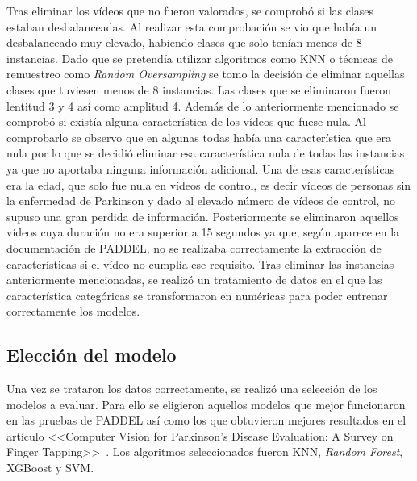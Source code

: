 Tras eliminar los vídeos que no fueron valorados, se comprobó si las clases estaban desbalanceadas. Al realizar esta comprobación se vio que había un desbalanceado muy elevado, habiendo clases que solo tenían menos de 8 instancias. Dado que se pretendía utilizar algoritmos como KNN o técnicas de remuestreo como \textit{Random Oversampling} se tomo la decisión de eliminar aquellas clases que tuviesen menos de 8 instancias. Las clases que se eliminaron fueron lentitud 3 y 4 así como amplitud 4.
Además de lo anteriormente mencionado se comprobó si existía alguna característica de los vídeos que fuese nula. Al comprobarlo se observo que en algunas todas había una característica que era nula por lo que se decidió eliminar esa característica nula de todas las instancias ya que no aportaba ninguna información adicional. Una de esas características era la edad, que solo fue nula en vídeos de control, es decir vídeos de personas sin la enfermedad de Parkinson y dado al elevado número de vídeos de control, no supuso una gran perdida de información. Posteriormente se eliminaron aquellos vídeos cuya duración no era superior a 15 segundos ya que, según aparece en la documentación de PADDEL, no se realizaba correctamente la extracción de características si el vídeo no cumplía ese requisito.
Tras eliminar las instancias anteriormente mencionadas, se realizó un tratamiento de datos en el que las característica categóricas se transformaron en numéricas para poder entrenar correctamente los modelos.

\subsection{Elección del modelo}

Una vez se trataron los datos correctamente, se realizó una selección de los modelos a evaluar. Para ello se eligieron aquellos modelos que mejor funcionaron en las pruebas de PADDEL así como los que obtuvieron mejores resultados en el artículo <<Computer Vision for Parkinson’s Disease Evaluation: A Survey on Finger Tapping>>~\cite{AmoSalas2024}. Los algoritmos seleccionados fueron KNN, \textit{Random Forest}, XGBoost y SVM.


